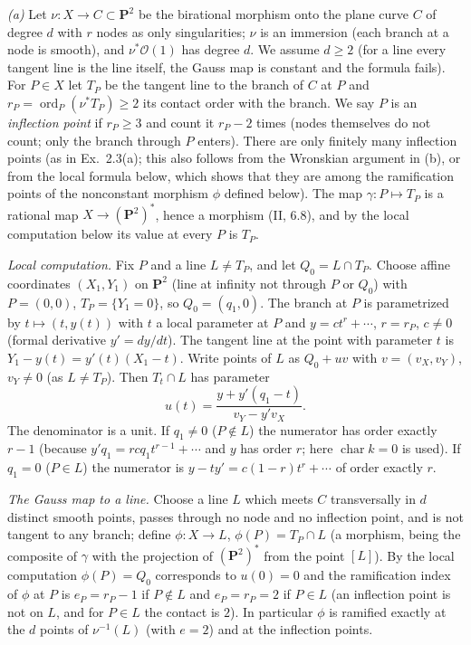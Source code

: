 \documentclass[11pt]{article}
\begin{document}
\emph{(a)} Let $\nu:X\to C\subset\mathbf P^2$ be the birational morphism onto the plane curve $C$ of degree $d$ with $r$ nodes as only singularities; $\nu$ is an immersion (each branch at a node is smooth), and $\nu^*\mathcal O(1)$ has degree $d$. We assume $d\ge2$ (for a line every tangent line is the line itself, the Gauss map is constant and the formula fails). For $P\in X$ let $T_P$ be the tangent line to the branch of $C$ at $P$ and $r_P=\operatorname{ord}_P(\nu^*T_P)\ge2$ its contact order with the branch. We say $P$ is an \emph{inflection point} if $r_P\ge3$ and count it $r_P-2$ times (nodes themselves do not count; only the branch through $P$ enters). There are only finitely many inflection points (as in Ex.~2.3(a); this also follows from the Wronskian argument in (b), or from the local formula below, which shows that they are among the ramification points of the nonconstant morphism $\phi$ defined below). The map $\gamma:P\mapsto T_P$ is a rational map $X\to(\mathbf P^2)^*$, hence a morphism (II, 6.8), and by the local computation below its value at every $P$ is $T_P$.

\emph{Local computation.} Fix $P$ and a line $L\ne T_P$, and let $Q_0=L\cap T_P$. Choose affine coordinates $(X_1,Y_1)$ on $\mathbf P^2$ (line at infinity not through $P$ or $Q_0$) with $P=(0,0)$, $T_P=\{Y_1=0\}$, so $Q_0=(q_1,0)$. The branch at $P$ is parametrized by $t\mapsto(t,y(t))$ with $t$ a local parameter at $P$ and $y=ct^{r}+\cdots$, $r=r_P$, $c\ne0$ (formal derivative $y'=dy/dt$). The tangent line at the point with parameter $t$ is $Y_1-y(t)=y'(t)(X_1-t)$. Write points of $L$ as $Q_0+uv$ with $v=(v_X,v_Y)$, $v_Y\ne0$ (as $L\ne T_P$). Then $T_t\cap L$ has parameter
\[ u(t)=\frac{y+y'(q_1-t)}{v_Y-y'v_X}. \]
The denominator is a unit. If $q_1\ne0$ ($P\notin L$) the numerator has order exactly $r-1$ (because $y'q_1=rcq_1t^{r-1}+\cdots$ and $y$ has order $r$; here $\operatorname{char}k=0$ is used). If $q_1=0$ ($P\in L$) the numerator is $y-ty'=c(1-r)t^r+\cdots$ of order exactly $r$.

\emph{The Gauss map to a line.} Choose a line $L$ which meets $C$ transversally in $d$ distinct smooth points, passes through no node and no inflection point, and is not tangent to any branch; define $\phi:X\to L$, $\phi(P)=T_P\cap L$ (a morphism, being the composite of $\gamma$ with the projection of $(\mathbf P^2)^*$ from the point $[L]$). By the local computation $\phi(P)=Q_0$ corresponds to $u(0)=0$ and the ramification index of $\phi$ at $P$ is $e_P=r_P-1$ if $P\notin L$ and $e_P=r_P=2$ if $P\in L$ (an inflection point is not on $L$, and for $P\in L$ the contact is $2$). In particular $\phi$ is ramified exactly at the $d$ points of $\nu^{-1}(L)$ (with $e=2$) and at the inflection points.
\end{document}
